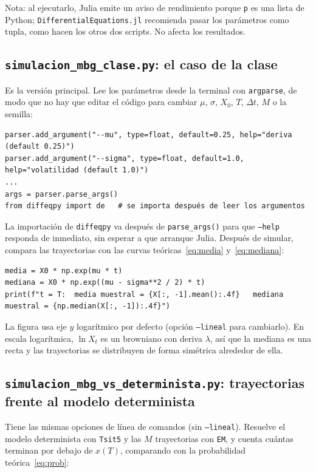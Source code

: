 \documentclass[11pt,a4paper]{article}
\begin{document}
Nota: al ejecutarlo, Julia emite un aviso de rendimiento porque \texttt{p} es una lista de Python; \texttt{DifferentialEquations.jl} recomienda pasar los parámetros como tupla, como hacen los otros dos scripts. No afecta los resultados.

\subsection{\texttt{simulacion\_mbg\_clase.py}: el caso de la clase}

Es la versión principal. Lee los parámetros desde la terminal con \texttt{argparse}, de modo que no hay que editar el código para cambiar $\mu$, $\sigma$, $X_0$, $T$, $\Delta t$, $M$ o la semilla:

\begin{lstlisting}
parser.add_argument("--mu", type=float, default=0.25, help="deriva (default 0.25)")
parser.add_argument("--sigma", type=float, default=1.0, help="volatilidad (default 1.0)")
...
args = parser.parse_args()
from diffeqpy import de   # se importa después de leer los argumentos
\end{lstlisting}

La importación de \texttt{diffeqpy} va después de \texttt{parse\_args()} para que \texttt{--help} responda de inmediato, sin esperar a que arranque Julia. Después de simular, compara las trayectorias con las curvas teóricas~\eqref{eq:media} y~\eqref{eq:mediana}:

\begin{lstlisting}
media = X0 * np.exp(mu * t)
mediana = X0 * np.exp((mu - sigma**2 / 2) * t)
print(f"t = T:  media muestral = {X[:, -1].mean():.4f}   mediana muestral = {np.median(X[:, -1]):.4f}")
\end{lstlisting}

La figura usa eje $y$ logarítmico por defecto (opción \texttt{--lineal} para cambiarlo). En escala logarítmica, $\ln X_t$ es un browniano con deriva $\lambda$, así que la mediana es una recta y las trayectorias se distribuyen de forma simétrica alrededor de ella.

\subsection{\texttt{simulacion\_mbg\_vs\_determinista.py}: trayectorias frente al modelo determinista}

Tiene las mismas opciones de línea de comandos (sin \texttt{--lineal}). Resuelve el modelo determinista con \texttt{Tsit5} y las $M$ trayectorias con \texttt{EM}, y cuenta cuántas terminan por debajo de $x(T)$, comparando con la probabilidad teórica~\eqref{eq:prob}:
\end{document}
